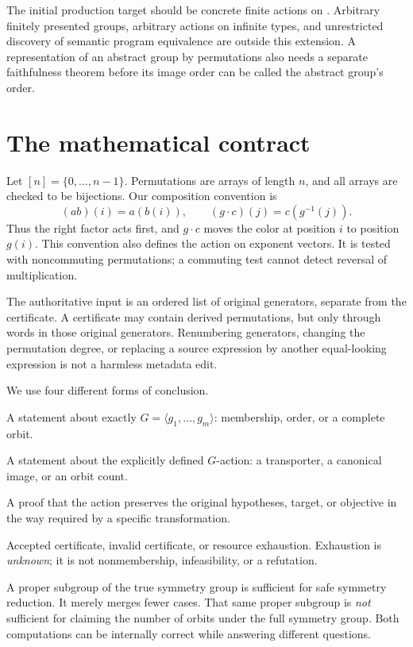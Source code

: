 The initial production target should be concrete finite actions on . Arbitrary finitely presented groups, arbitrary actions on infinite types, and unrestricted discovery of semantic program equivalence are outside this extension. A representation of an abstract group by permutations also needs a separate faithfulness theorem before its image order can be called the abstract group's order.

\section{The mathematical contract}
\label{sec:contract}
Let $[n]=\{0,\ldots,n-1\}$. Permutations are arrays of length $n$, and all arrays are checked to be bijections. Our composition convention is
\[
  (ab)(i)=a(b(i)),\qquad (g\cdot c)(j)=c(g^{-1}(j)).
\]
Thus the right factor acts first, and $g\cdot c$ moves the color at position $i$ to position $g(i)$. This convention also defines the action on exponent vectors. It is tested with noncommuting permutations; a commuting test cannot detect reversal of multiplication.

The authoritative input is an ordered list of original generators, separate from the certificate. A certificate may contain derived permutations, but only through words in those original generators. Renumbering generators, changing the permutation degree, or replacing a source expression by another equal-looking expression is not a harmless metadata edit.

We use four different forms of conclusion.
\begin{description}[style=nextline]
\item[Group fact.] A statement about exactly $G=\langle g_1,\ldots,g_m\rangle$: membership, order, or a complete orbit.
\item[Action fact.] A statement about the explicitly defined $G$-action: a transporter, a canonical image, or an orbit count.
\item[Source authorization.] A proof that the action preserves the original hypotheses, target, or objective in the way required by a specific transformation.
\item[Operational outcome.] Accepted certificate, invalid certificate, or resource exhaustion. Exhaustion is \emph{unknown}; it is not nonmembership, infeasibility, or a refutation.
\end{description}

A proper subgroup of the true symmetry group is sufficient for safe symmetry reduction. It merely merges fewer cases. That same proper subgroup is \emph{not} sufficient for claiming the number of orbits under the full symmetry group. Both computations can be internally correct while answering different questions.
